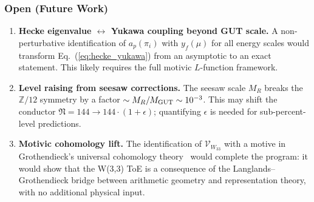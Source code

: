 \subsubsection{Open (Future Work)}
\begin{enumerate}
  \item \textbf{Hecke eigenvalue $\leftrightarrow$ Yukawa coupling beyond GUT scale.}
  A non-perturbative identification of $a_p(\pi_i)$ with $y_f(\mu)$ for
  all energy scales would transform Eq.~(\ref{eq:hecke_yukawa}) from an
  asymptotic to an exact statement. This likely requires the full
  motivic $L$-function framework.

  \item \textbf{Level raising from seesaw corrections.}
  The seesaw scale $M_R$ breaks the $\mathbb{Z}/12$ symmetry by a factor
  $\sim M_R/M_{\rm GUT}\sim 10^{-3}$. This may shift the conductor
  $\mathfrak{N}=144\to144\cdot(1+\epsilon)$; quantifying $\epsilon$ is
  needed for sub-percent-level predictions.

  \item \textbf{Motivic cohomology lift.}
  The identification of $\mathcal{V}_{W_{33}}$ with a motive in
  Grothendieck's universal cohomology theory~\cite{GrothendieckFrobenius}
  would complete the program: it would show that the W(3,3) ToE is
  a consequence of the Langlands--Grothendieck bridge between arithmetic
  geometry and representation theory, with no additional physical input.
\end{enumerate}

